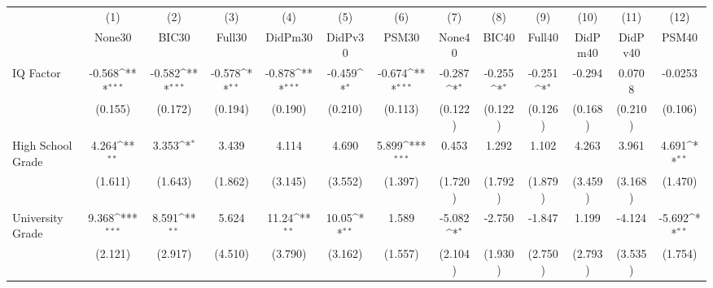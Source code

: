 {
\def\sym#1{\ifmmode^{#1}\else\(^{#1}\)\fi}
\begin{tabular}{l*{12}{c}}
\toprule
            &\multicolumn{1}{c}{(1)}&\multicolumn{1}{c}{(2)}&\multicolumn{1}{c}{(3)}&\multicolumn{1}{c}{(4)}&\multicolumn{1}{c}{(5)}&\multicolumn{1}{c}{(6)}&\multicolumn{1}{c}{(7)}&\multicolumn{1}{c}{(8)}&\multicolumn{1}{c}{(9)}&\multicolumn{1}{c}{(10)}&\multicolumn{1}{c}{(11)}&\multicolumn{1}{c}{(12)}\\
            &\multicolumn{1}{c}{None30}&\multicolumn{1}{c}{BIC30}&\multicolumn{1}{c}{Full30}&\multicolumn{1}{c}{DidPm30}&\multicolumn{1}{c}{DidPv30}&\multicolumn{1}{c}{PSM30}&\multicolumn{1}{c}{None40}&\multicolumn{1}{c}{BIC40}&\multicolumn{1}{c}{Full40}&\multicolumn{1}{c}{DidPm40}&\multicolumn{1}{c}{DidPv40}&\multicolumn{1}{c}{PSM40}\\
\midrule
IQ Factor   &      -0.568\sym{***}&      -0.582\sym{***}&      -0.578\sym{**} &      -0.878\sym{***}&      -0.459\sym{*}  &      -0.674\sym{***}&      -0.287\sym{*}  &      -0.255\sym{*}  &      -0.251\sym{*}  &      -0.294         &      0.0708         &     -0.0253         \\
            &     (0.155)         &     (0.172)         &     (0.194)         &     (0.190)         &     (0.210)         &     (0.113)         &     (0.122)         &     (0.122)         &     (0.126)         &     (0.168)         &     (0.210)         &     (0.106)         \\
\addlinespace
High School Grade&       4.264\sym{**} &       3.353\sym{*}  &       3.439         &       4.114         &       4.690         &       5.899\sym{***}&       0.453         &       1.292         &       1.102         &       4.263         &       3.961         &       4.691\sym{**} \\
            &     (1.611)         &     (1.643)         &     (1.862)         &     (3.145)         &     (3.552)         &     (1.397)         &     (1.720)         &     (1.792)         &     (1.879)         &     (3.459)         &     (3.168)         &     (1.470)         \\
\addlinespace
University Grade&       9.368\sym{***}&       8.591\sym{**} &       5.624         &       11.24\sym{**} &       10.05\sym{**} &       1.589         &      -5.082\sym{*}  &      -2.750         &      -1.847         &       1.199         &      -4.124         &      -5.692\sym{**} \\
            &     (2.121)         &     (2.917)         &     (4.510)         &     (3.790)         &     (3.162)         &     (1.557)         &     (2.104)         &     (1.930)         &     (2.750)         &     (2.793)         &     (3.535)         &     (1.754)         \\

\end{tabular}}
